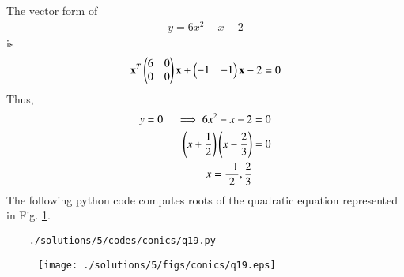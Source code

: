 	
The vector form of 
\begin{align}
y = 6x^2-x-2 
\end{align}
is
\begin{align}
	\mathbf{x}^T\begin{pmatrix}6&0\\0&0\end{pmatrix}\mathbf{x}  + \begin{pmatrix}-1&-1\end{pmatrix}\mathbf{x} -2 = 0
	\end{align}
	Thus, 
	\begin{align}
	y = 0 \quad \implies 6x^2-x-2 &= 0
	\\
	\left(x+\frac{1}{2}\right)\left(x-\frac{2}{3}\right) &= 0
	\\
	x = \frac{-1}{2},\frac{2}{3}&
	\end{align}
	The following python code computes roots of the quadratic equation represented in Fig. \ref{fig:5.1.5_qnineteen}.
	\begin{lstlisting}
	./solutions/5/codes/conics/q19.py
	\end{lstlisting}
	\begin{figure}[!ht]
	\centering
	\texttt{[image: ./solutions/5/figs/conics/q19.eps]}
	\caption{}
	\label{fig:5.1.5_qnineteen}	
	\end{figure}
	
	
